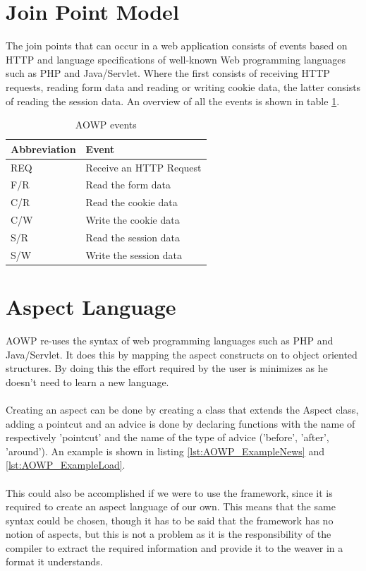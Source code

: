 \documentclass[a4paper]{report}
\begin{document}
\section{Join Point Model}
The join points that can occur in a web application consists of events based on HTTP and language specifications of well-known Web programming languages such as PHP and Java/Servlet. Where the first consists of receiving HTTP requests, reading form data and reading or writing cookie data, the latter consists of reading the session data. An overview of all the events is shown in table \ref{tab:AOWP_Events}.
\begin{table}
\centering
\begin{tabular}{l|l}
\hline
Abbreviation & Event\\
\hline
\hline
REQ & Receive an HTTP Request\\
\hline
F/R & Read the form data\\
\hline
C/R & Read the cookie data\\
\hline
C/W & Write the cookie data\\
\hline
S/R & Read the session data\\
\hline
S/W & Write the session data\\
\hline
\end{tabular}
\caption{AOWP events}
\label{tab:AOWP_Events}
\end{table}

\section{Aspect Language}
AOWP re-uses the syntax of web programming languages such as PHP and Java/Servlet. It does this by mapping the aspect constructs on to object oriented structures. By doing this the effort required by the user is minimizes as he doesn't need to learn a new language.\\
\\
Creating an aspect can be done by creating a class that extends the Aspect class, adding a pointcut and an advice is done by declaring functions with the name of respectively 'pointcut' and the name of the type of advice ('before', 'after', 'around'). An example is shown in listing \ref{lst:AOWP_ExampleNews} and \ref{lst:AOWP_ExampleLoad}.\\
\\
This could also be accomplished if we were to use the framework, since it is required to create an aspect language of our own. This means that the same syntax could be chosen, though it has to be said that the framework has no notion of aspects, but this is not a problem as it is the responsibility of the compiler to extract the required information and provide it to the weaver in a format it understands.
\end{document}

